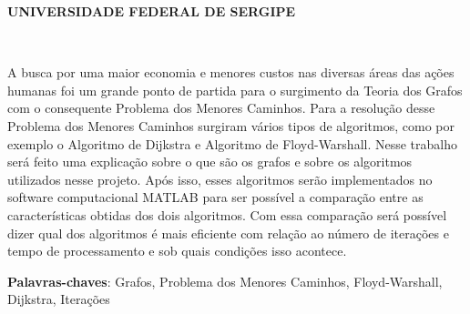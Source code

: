 \documentclass[
12pt,				%
openright,			%
oneside,			%
a4paper,			%
english,			%
french,				%
spanish,			%
brazil,				%
]{abntex2}
\renewcommand{\imprimircapa}{%
	\begin{capa}%
		\center
		\ABNTEXchapterfont\Large \textbf{UNIVERSIDADE FEDERAL DE SERGIPE}
		\\
		\vspace*{1cm}
		{\ABNTEXchapterfont\large\imprimirautor}
		\vfill
		\begin{center}
			\ABNTEXchapterfont\bfseries\LARGE\imprimirtitulo
		\end{center}
		\vfill
		\large\imprimirlocal \\
		\large\imprimirdata
		\vspace*{1cm}
	\end{capa}
}
\begin{document}
	\lstset{language=Matlab} 
	
	\frenchspacing 
	
	
	\imprimircapa
	
	\imprimirfolhaderosto*
	
	
	
	\setlength{\absparsep}{18pt} %
	\begin{resumo}
		
		A busca por uma maior economia e menores custos nas diversas áreas das ações humanas foi um grande ponto de partida para o surgimento da Teoria dos Grafos com o consequente Problema dos Menores Caminhos. Para a resolução desse Problema dos Menores Caminhos surgiram vários tipos de algoritmos, como por exemplo o Algoritmo de Dijkstra e Algoritmo de Floyd-Warshall. Nesse trabalho será feito uma explicação sobre o que são os grafos e sobre os algoritmos utilizados nesse projeto. Após isso, esses algoritmos serão implementados no software computacional MATLAB para ser possível a comparação entre as características obtidas dos dois algoritmos. Com essa comparação será possível dizer qual dos algoritmos é mais eficiente com relação ao número de iterações e tempo de processamento e sob quais condições isso acontece.
		
		\noindent
		\textbf{Palavras-chaves}: Grafos, Problema dos Menores Caminhos, Floyd-Warshall, Dijkstra, Iterações
	\end{resumo}
	
	\listoffigures*
	\pagebreak
	
	\listoftables*
	\pagebreak
	
	
	
	\tableofcontents*
	\pagebreak
	
\end{document}
